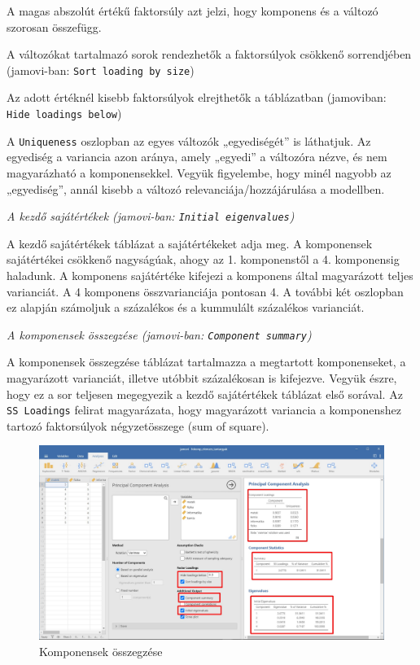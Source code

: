 \documentclass[
  letterpaper,
]{krantz}
\begin{document}
A magas abszolút értékű faktorsúly azt jelzi, hogy komponens és a
változó szorosan összefügg.

A változókat tartalmazó sorok rendezhetők a faktorsúlyok csökkenő
sorrendjében (jamovi-ban: \texttt{Sort\ loading\ by\ size})

Az adott értéknél kisebb faktorsúlyok elrejthetők a táblázatban
(jamoviban: \texttt{Hide\ loadings\ below})

A \texttt{Uniqueness} oszlopban az egyes változók „egyediségét'' is
láthatjuk. Az egyediség a variancia azon aránya, amely „egyedi'' a
változóra nézve, és nem magyarázható a komponensekkel. Vegyük
figyelembe, hogy minél nagyobb az „egyediség'', annál kisebb a változó
relevanciája/hozzájárulása a modellben.

\emph{A kezdő sajátértékek (jamovi-ban: \texttt{Initial\ eigenvalues})}

A kezdő sajátértékek táblázat a sajátértékeket adja meg. A komponensek
sajátértékei csökkenő nagyságúak, ahogy az 1. komponenstől a 4.
komponensig haladunk. A komponens sajátértéke kifejezi a komponens által
magyarázott teljes varianciát. A 4 komponens összvarianciája pontosan 4.
A további két oszlopban ez alapján számoljuk a százalékos és a kummulált
százalékos varianciát.

\emph{A komponensek összegzése (jamovi-ban:
\texttt{Component\ summary})}

A komponensek összegzése táblázat tartalmazza a megtartott
komponenseket, a magyarázott varianciát, illetve utóbbit százalékosan is
kifejezve. Vegyük észre, hogy ez a sor teljesen megegyezik a kezdő
sajátértékek táblázat első sorával. Az \texttt{SS\ Loadings} felirat
magyarázata, hogy magyarázott variancia a komponenshez tartozó
faktorsúlyok négyzetösszege (sum of square).

\begin{figure}

{\centering \includegraphics{./images/fokomponens_kep_04.jpg}

}

\caption{Komponensek összegzése}

\end{figure}
\end{document}
